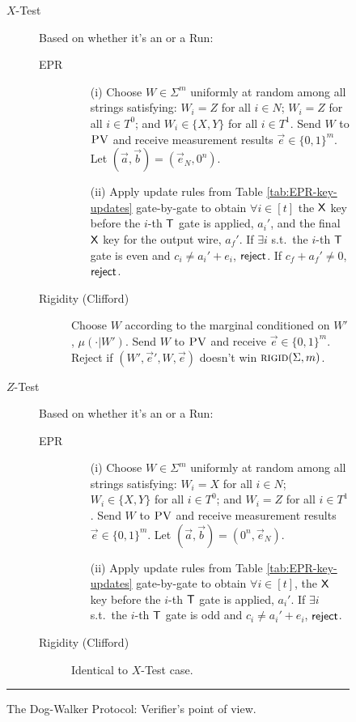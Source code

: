 \begin{figure}[H]
\begin{description}
\begin{description}
\begin{enumerate}
		\end{enumerate}
	\end{description}
\item[$X$-Test] Based on whether it's an  or a  Run:
\begin{description}
	\item[EPR] 
	\begin{enumerate}
		\item[(i)] Choose $W\in\Sigma^m$ uniformly at random among all strings satisfying: $W_i=Z$ for all $i\in N$; $W_i=Z$ for all $i\in T^0$; and $W_i\in\{X,Y\}$ for all $i\in T^1$. Send $W$ to $\textsc{PV}$ and receive measurement results $\vec{e}\in\{0,1\}^m$. Let $(\vec{a},\vec{b})=(\vec{e}_N,0^n)$. 
		\item[(ii)] Apply update rules from Table \ref{tab:EPR-key-updates} gate-by-gate to obtain $\forall i\in [t]$ the $\sf X$ key before the $i$-th $\sf T$ gate is applied, $a_i'$, and the final $\sf X$ key for the output wire, $a_f'$. 
If $\exists i$ s.t.\ the $i$-th $\sf T$ gate is even and $c_i\neq a_i'+e_i$, $\sf reject$. If $c_f+a_f'\neq 0$, $\sf reject$. 
	\end{enumerate}
	\item[Rigidity (Clifford)] Choose ${W}$ according to the marginal conditioned on ${W}'$, $\mu(\cdot|{W}')$. 
	Send ${W}$ to $\textsc{PV}$ and receive $\vec{e}\in\{0,1\}^m$. Reject if   $({W}',\vec{e}',{W},\vec{e})$ doesn't win $\textsc{rigid}(\Sigma,m)$. 
\end{description}

\item[$Z$-Test] Based on whether it's an  or a  Run:
\begin{description}
	\item[EPR] 
	\begin{enumerate}
		\item[(i)] Choose $W\in\Sigma^m$ uniformly at random among all strings satisfying: $W_i=X$ for all $i\in N$; $W_i\in\{X,Y\}$ for all $i\in T^0$; and $W_i=Z$ for all $i\in T^1$. Send $W$ to $\textsc{PV}$ and receive measurement results $\vec{e}\in\{0,1\}^m$. Let $(\vec{a},\vec{b})=(0^n,\vec{e}_N)$.
		\item[(ii)] Apply update rules from Table \ref{tab:EPR-key-updates} gate-by-gate to obtain $\forall i\in [t]$, the $\sf X$ key before the $i$-th $\sf T$ gate is applied, $a_i'$. 
If $\exists i$ s.t.\ the $i$-th $\sf T$ gate is odd and $c_i\neq a_i'+e_i$, $\sf reject$. 
	\end{enumerate}
	\item[Rigidity (Clifford)] Identical to $X$-Test case.
\end{description}
\end{description}
\rule[2ex]{\textwidth}{0.5pt}\vspace{-.5cm}
\caption{The Dog-Walker Protocol: Verifier's point of view.}\label{fig:dogwalker-protocol-V}
\end{figure}




